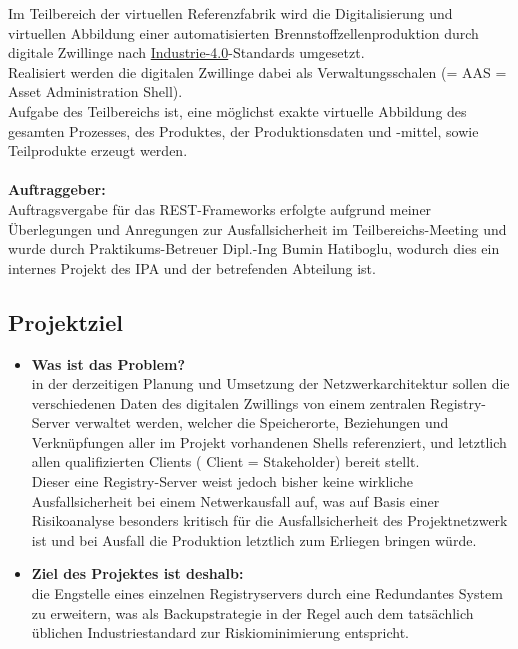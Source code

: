 Im Teilbereich der virtuellen Referenzfabrik wird die Digitalisierung und virtuellen Abbildung einer automatisierten Brennstoffzellenproduktion durch digitale 
Zwillinge nach \href{Navigation/DE/Home/home.html}{Industrie-4.0}-Standards umgesetzt.\\
Realisiert werden die digitalen Zwillinge dabei als Verwaltungsschalen (= AAS = Asset
Administration Shell).\\ 
 Aufgabe des Teilbereichs ist, eine möglichst exakte virtuelle Abbildung des gesamten Prozesses, des Produktes, der Produktionsdaten und -mittel, sowie Teilprodukte erzeugt werden.\\
 \\
\textbf{Auftraggeber:} \\
Auftragsvergabe für das REST-Frameworks erfolgte aufgrund meiner Überlegungen und Anregungen zur Ausfallsicherheit im Teilbereichs-Meeting und wurde durch Praktikums-Betreuer Dipl.-Ing Bumin Hatiboglu, wodurch dies ein internes Projekt des IPA und der betrefenden Abteilung ist.



\subsection{Projektziel}\label{sec:Projektziel}
\begin{itemize}
	\item \textbf{Was ist das Problem?}\\
    in der derzeitigen Planung und Umsetzung der Netzwerkarchitektur sollen die verschiedenen Daten des digitalen Zwillings von einem zentralen Registry-Server verwaltet werden, welcher die Speicherorte, Beziehungen und Verknüpfungen aller im Projekt vorhandenen Shells referenziert, und letztlich allen qualifizierten Clients ( Client = Stakeholder) bereit stellt.\\
    Dieser eine Registry-Server weist jedoch bisher keine wirkliche Ausfallsicherheit bei einem Netwerkausfall auf, was auf Basis einer Risikoanalyse besonders kritisch für die Ausfallsicherheit des Projektnetzwerk ist und bei Ausfall die Produktion letztlich zum Erliegen bringen würde.
	\item \textbf{Ziel des Projektes ist deshalb:}\\
    die Engstelle eines einzelnen Registryservers durch eine Redundantes System zu erweitern, was als Backupstrategie in der Regel  auch dem tatsächlich üblichen Industriestandard zur Riskiominimierung entspricht.  
    
\end{itemize}


